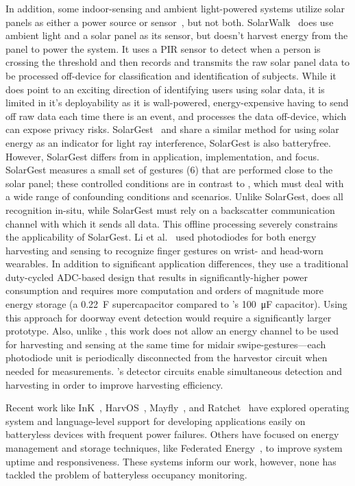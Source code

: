 In addition, some indoor-sensing and ambient light-powered systems utilize solar panels as either a power source or sensor~\cite{campbell2014energy, billah2022solarwalk, li2018self}, but not both. SolarWalk~\cite{billah2022solarwalk} does use ambient light and a solar panel as its sensor, but doesn't harvest energy from the panel to power the system.  It uses a PIR sensor to detect when a person is crossing the threshold and then records and transmits the raw solar panel data to be processed off-device for classification and identification of subjects.  While it does point to an exciting direction of identifying users using solar data, it is limited in it's deployability as it is wall-powered, energy-expensive having to send off raw data each time there is an event, and processes the data off-device, which can expose privacy risks.
SolarGest~\cite{ma2019solargest} and \sysname share a similar method for using solar energy as an indicator for light ray interference, SolarGest is also batteryfree. However, SolarGest differs from \sysname in application, implementation, and focus. SolarGest measures a small set of gestures (6) that are performed close to the solar panel; these controlled conditions are in contrast to \sysname, which must deal with a wide range of confounding conditions and scenarios. Unlike SolarGest, \sysname does all recognition in-situ, while SolarGest must rely on a backscatter communication channel with which it sends all data. This offline processing severely constrains the applicability of SolarGest. Li et al.~\cite{li2018self} used photodiodes for both energy harvesting and sensing to recognize finger gestures on wrist- and head-worn wearables. In addition to significant application differences, they use a traditional duty-cycled ADC-based design that results in significantly-higher power consumption and requires more computation and orders of magnitude more energy storage (a \SI{0.22}{\farad} supercapacitor compared to \sysname's \SI{100}{\micro\farad} capacitor). Using this approach for doorway event detection would require a significantly larger prototype. 
Also, unlike \sysname, this work does not allow an energy channel to be used for harvesting and sensing at the same time for midair swipe-gestures---each photodiode unit is periodically disconnected from the harvestor circuit when needed for measurements.
\sysname's detector circuits enable simultaneous detection and harvesting in order to improve harvesting efficiency.



Recent work like InK~\cite{yildirim2018ink}, HarvOS~\cite{bhatti2017harvos}, Mayfly~\cite{hester2017mayfly}, and Ratchet~\cite{van2016intermittent} have explored operating system and language-level support for developing applications easily on batteryless devices with frequent power failures.
Others have focused on energy management and storage techniques, like  Federated Energy~\cite{jhester:ufop:sensys}, to improve system uptime and responsiveness.
These systems inform our work, however, none has tackled the problem of batteryless occupancy monitoring.
